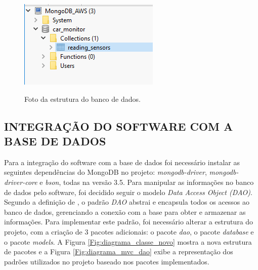 \begin{figure}[!ht]
\centering
\caption{Foto da estrutura do banco de dados.} 
{\includegraphics[scale=1.5]{imagens/baseDadosBanco.png}}\\
 \label{Fig:base_dados}
\end{figure}

\subsection{INTEGRAÇÃO DO SOFTWARE COM A BASE DE DADOS}
Para a integração do software com a base de dados foi necessário instalar as seguintes dependências do MongoDB no projeto: \textit{mongodb-driver}, \textit{mongodb-driver-core} e \textit{bson}, todas na versão 3.5. Para manipular as informações no banco de dados pelo software, foi decidido seguir o modelo \textit{Data Access Object (DAO)}. Segundo a definição de , o padrão \textit{DAO} abstrai e encapsula todos os acessos ao banco de dados, gerenciando a conexão com a base para obter e armazenar as informações. Para implementar este padrão, foi necessário alterar a estrutura do projeto, com a criação de 3 pacotes adicionais: o pacote \textit{dao}, o pacote \textit{database} e o pacote \textit{models}. A Figura \ref{Fig:diagrama_classe_novo} mostra a nova estrutura de pacotes e a Figura \ref{Fig:diagrama_mvc_dao} exibe a representação dos padrões utilizados no projeto baseado nos pacotes implementados.

